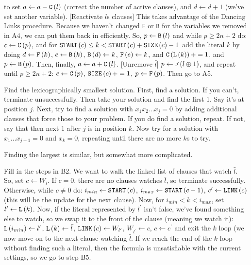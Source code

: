  to set $a \gets a - {\tt C}\left(l\right)$ (correct the number of active clauses),
 and $d \gets d + 1$ (we've set another variable).
 [Reactivate $l$s clauses] This takes advantage of the 
 Dancing Links procedure.  Because we haven't changed {\tt F} or {\tt B} for the variables
 we removed in A4, we can put them back in efficiently.  So, $p \gets {\tt B}\left(l\right)$
 and while $p \ge 2 n + 2$ do: $c \gets {\tt C}\left(p\right)$, and for
 ${\tt START}\left(c\right) \le k < {\tt START}\left(c\right) + {\tt SIZE}\left(c\right) - 1$
add the literal $k$ by doing $d \gets {\tt F}\left(k\right)$, $e \gets {\tt B}\left(k\right)$,
${\tt B}\left(d\right) \gets k$, ${\tt F}\left(e\right) \gets k$, and 
${\tt C}\left({\tt L}\left(k\right)\right) += 1$, and $p \gets {\tt B}\left(p\right)$.
Then, finally, $a \gets a + {\tt C}\left(l\right)$.
 [Unremove $\bar l$] $p \gets {\tt F}\left(l \oplus 1\right)$,
and repeat until $p \ge 2 n + 2$: $c \gets {\tt C}\left(p\right)$,
${\tt SIZE}\left(c\right) += 1$, $p \gets {\tt F}\left(p\right)$.  Then go to A5.

\vskip 0.08in  Find the lexicographically smallest
solution.\hfil\break
First, find a solution.  If you can't, terminate unsuccessfully.  Then take your
solution and find the first 1.  Say it's at position $j$.  Next, try to find a solution
with $x_1 x_2 \ldots x_j = 0$ by adding additional clauses that force those
to your problem.  If you do find a solution, repeat.  If not, say that then next
1 after $j$ is in position $k$.  Now try for a solution with $x_1 \ldots x_{j-1} = 0$
and $x_k = 0$, repeating until there are no more $k$s to try.

Finding the largest is similar, but somewhat more complicated.

 Fill in the steps in B2.\hfil\break
We want to walk the linked list of clauses that watch $\bar l$.  So, set
$c \gets W_{\bar l}$.  If $c = 0$, there are no clauses watches $\bar l$, so
terminate successfully.  Otherwise, while $c \ne 0$ do: $i_{min} \gets {\tt START}
\left(c\right)$, $i_{max} \gets {\tt START}\left(c - 1\right)$, $c^{\prime} \gets 
{\tt LINK}\left(c\right)$ (this will be the update for the next clause).
Now, for $i_{min} < k < i_{max}$, set $l^{\prime} \gets {\tt L}\left(k\right)$.
Now, if the literal represented by $l^{\prime}$ isn't false, we've found
something else to watch, so we swap it to the front of the clause (meaning we
watch it): ${\tt L}\left(i_{min}\right) \gets l^{\prime}$, ${\tt L}\left(k\right) \gets \bar l$,
${\tt LINK}\left(c\right) \gets W_{l^{\prime}}$, $W_{l^{\prime}} \gets c$, $c \gets c^{\prime}$
and exit the $k$ loop (we now move on to the next clause watching $\bar l$.
If we reach the end of the $k$ loop without finding such a literal, then the formula
is unsatisfiable with the current settings, so we go to step B5.

